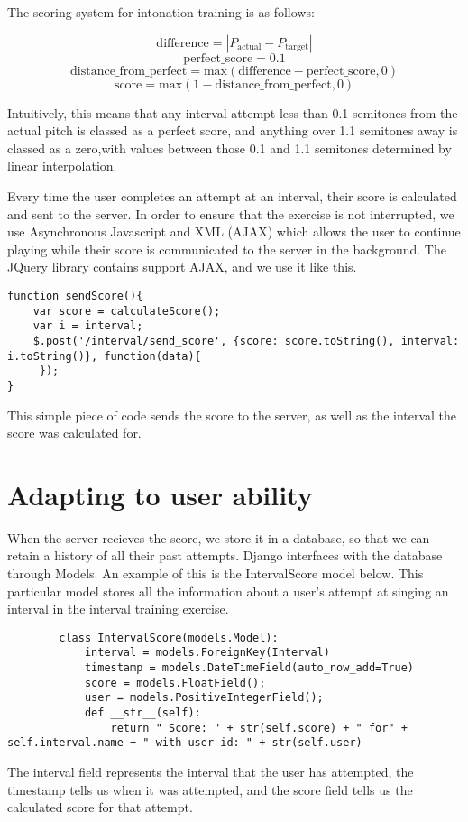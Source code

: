 The scoring system for intonation training is as follows:

\[\text{difference} = |P_\text{actual}- P_\text{target}|\]
\[\text{perfect\_score} = 0.1 \]
\[\text{distance\_from\_perfect} = \text{max}(\text{difference}-\text{perfect\_score},0)\]
\[\text{score} = \text{max}(1 - \text{distance\_from\_perfect},0)\]

Intuitively, this means that any interval attempt less than 0.1 semitones from the actual pitch is classed as a perfect score, and anything over 1.1 semitones away is classed as a zero,with values between those 0.1 and 1.1 semitones determined by linear interpolation.

Every time the user completes an attempt at an interval, their score is calculated and sent to the server. In order to ensure that the exercise is not interrupted, we use Asynchronous Javascript and XML (AJAX) which allows the user to continue playing while their score is communicated to the server in the background. The JQuery library contains support AJAX, and we use it like this.

\begin{lstlisting}
function sendScore(){
    var score = calculateScore();
    var i = interval;
    $.post('/interval/send_score', {score: score.toString(), interval: i.toString()}, function(data){
     });
}
\end{lstlisting}

This simple piece of code sends the score to the server, as well as the interval the score was calculated for.

\section{Adapting to user ability}

When the server recieves the score, we store it in a database, so that we can retain a history of all their past attempts.
Django interfaces with the database through Models. An example of this is the IntervalScore model below. This particular model stores all the information about a user's attempt at singing an interval in the interval training exercise.
		
		\begin{lstlisting}
		class IntervalScore(models.Model):
   			interval = models.ForeignKey(Interval) 
    		timestamp = models.DateTimeField(auto_now_add=True)
    		score = models.FloatField();
		    user = models.PositiveIntegerField();
		    def __str__(self):
        		return " Score: " + str(self.score) + " for" + self.interval.name + " with user id: " + str(self.user)

		\end{lstlisting}
		The interval field represents the interval that the user has attempted, the timestamp tells us when it was attempted, and the score field tells us the calculated score for that attempt.
		
